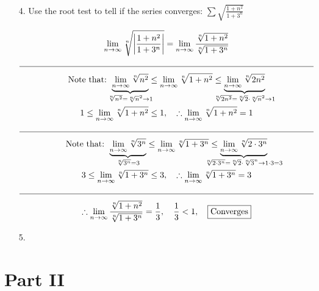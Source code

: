 \begin{itemize}
        \item [4.] Use the root test to tell if the series converges: $\sum\sqrt{\frac{1+n^{2}}{1+3^{n}}}$
        \\
        \begin{mdframed}
            \begin{equation*}
                \begin{gathered}
                    \lim_{n \to \infty}
                    \sqrt[n]
                    {\left|
                        \frac{1+n^{2}}{1+3^{n}}
                    \right|}
                    = \lim_{n \to \infty}
                    \frac{\sqrt[n]{1+n^{2}}}{\sqrt[n]{1+3^{n}}}                 \\
                    \horizontal                                                 \\
                    \text{Note that: } 
                    \underbrace{\lim_{n \to \infty}\sqrt[n]{n^{2}}}
                    _{\mathclap{\sqrt[n]{n^{2}} = \sqrt[n]{n}^{2} \to 1}} \leq
                    \lim_{n \to \infty}\sqrt[n]{1+n^{2}} \leq
                    \underbrace{\lim_{n \to \infty}\sqrt[n]{2n^{2}}}
                    _{\mathclap{\sqrt[n]{2n^{2}} = 
                    \sqrt[n]{2}\cdot\sqrt[n]{n}^{2} \to 1}}  \\
                    1 \leq \lim_{n \to \infty}\sqrt[n]{1+n^{2}} \leq 1, \quad 
                    \therefore \lim_{n \to \infty}\sqrt[n]{1+n^{2}} = 1         \\
                    \horizontal                                                 \\
                    \text{Note that: } 
                    \underbrace{\lim_{n \to \infty}\sqrt[n]{3^{n}}}
                    _{\mathclap{\sqrt[n]{3^{n}} = 3}} \leq
                    \lim_{n \to \infty}\sqrt[n]{1+3^{n}} \leq
                    \underbrace{\lim_{n \to \infty}\sqrt[n]{2\cdot3^{n}}}
                    _{\mathclap{\sqrt[n]{2\cdot3^{n}} = 
                    \sqrt[n]{2}\cdot\sqrt[n]{3}^{n} \to 1\cdot3 = 3}}           \\
                    3 \leq \lim_{n \to \infty}\sqrt[n]{1+3^{n}} \leq 3, \quad 
                    \therefore \lim_{n \to \infty}\sqrt[n]{1+3^{n}} = 3         \\
                    \horizontal                                                 \\
                    \therefore \lim_{n \to \infty}
                    \frac{\sqrt[n]{1+n^{2}}}{\sqrt[n]{1+3^{n}}} = \frac{1}{3}, \quad
                    \frac{1}{3} < 1, \quad \boxed{\text{Converges}}
                \end{gathered}
            \end{equation*}
        \end{mdframed}

        \item [5.] 
    \end{itemize}

    \pagebreak

    \section*{Part II}


